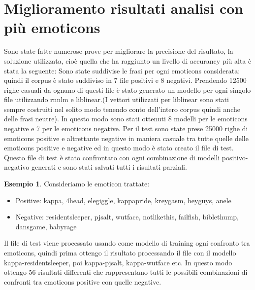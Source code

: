 \documentclass[a4paper,12pt,openright,twoside]{report}
\theoremstyle{definition}
\newtheorem{es}{Esempio}[section]
\begin{document}
\section{Miglioramento risultati analisi con più emoticons}
Sono state fatte numerose prove per migliorare la precisione del risultato, la soluzione utilizzata, cioè quella che ha raggiunto un livello di accurancy più alta è stata la seguente:
Sono state suddivise le frasi per ogni emoticons considerata: quindi il corpus è stato suddiviso in 7 file positivi e 8 negativi. Prendendo 12500 righe casuali da ognuno di questi file è stato generato un modello per ogni singolo file utilizzando rnnlm e liblinear.(I vettori utilizzati per liblinear sono stati sempre costruiti nel solito modo tenendo conto dell'intero corpus quindi anche delle frasi neutre). In questo modo sono stati ottenuti 8 modelli per le emoticons negative e 7 per le emoticons negative.
Per il test sono state prese 25000 righe di emoticons positive e altrettante negative in maniera casuale tra tutte quelle delle emoticons positive e negative ed in questo modo è stato creato il file di test. Questo file di test è stato confrontato con ogni combinazione di modelli positivo-negativo generati e sono stati salvati tutti i risultati parziali.
\begin{es}
Consideriamo le emoticon trattate:
\begin{itemize}
\item Positive: kappa, 4head, elegiggle, kappapride, kreygasm, heyguys, anele
\item Negative: residentsleeper, pjsalt, wutface, notlikethis, failfish, biblethump, dansgame, babyrage
\end{itemize}
Il file di test viene processato usando come modello di training ogni confronto tra emoticons, quindi prima ottengo il risultato processando il file con il modello kappa-residentsleeper, poi kappa-pjsalt, kappa-wutface etc. In questo modo ottengo 56 risultati differenti che rappresentano tutti le possibili combinazioni di confronti tra emoticons positive con quelle negative.
\end{es}
\end{document}
